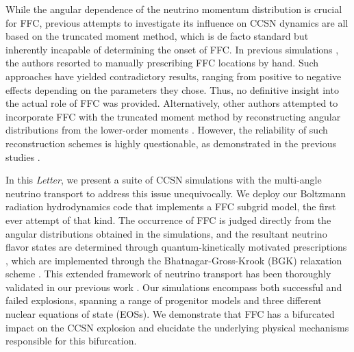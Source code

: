 \documentclass[
reprint,
superscriptaddress,
amsmath,amssymb,
aps,
prl
]{revtex4-2}
\begin{document}
While the angular dependence of the neutrino momentum distribution is crucial for FFC, previous attempts to investigate its influence on CCSN dynamics are all based on the truncated moment method, which is de facto standard but inherently incapable of determining the onset of FFC.
In previous simulations \cite{Ehring2023PhRvD.107j3034E,Ehring2023PhRvL.131f1401E,Mori2025PASJ..tmp...18M}, the authors resorted to manually prescribing FFC locations by hand. Such approaches have yielded contradictory results, ranging from positive to negative effects depending on the parameters they chose. Thus, no definitive insight into the actual role of FFC was provided.
Alternatively, other authors attempted to incorporate FFC with the truncated moment method by reconstructing angular distributions from the lower-order moments \cite{Wang2025ApJ...986..153W,Wang2025arXiv251120767W}.
However, the reliability of such reconstruction schemes is highly questionable, as demonstrated in the previous studies \cite{Nagakura2021PhRvD.104f3014N,Nagakura2021PhRvD.104h3025N,Johns2021PhRvD.103l3012J,Cornelius2025PhRvD.112f3004C}.

In this {\em Letter}, we present a suite of CCSN simulations with the multi-angle neutrino transport to address this issue unequivocally. We deploy our Boltzmann radiation hydrodynamics code that implements a FFC subgrid model, the first ever attempt of that kind.
The occurrence of FFC is judged directly from the angular distributions obtained in the simulations, and the resultant neutrino flavor states are determined through quantum-kinetically motivated prescriptions \cite{Nagakura2019ApJ...886..139N,Zaizen2023PhRvD.107j3022Z}, which are implemented through the Bhatnagar-Gross-Krook (BGK) relaxation scheme \cite{Bhatnagar1954PhRv...94..511B,Nagakura2024PhRvD.109h3013N}.
This extended framework of neutrino transport has been thoroughly validated in our previous work \cite{Akaho2025PhRvD.112d3015A}.
Our simulations encompass both successful and failed explosions, spanning a range of progenitor models and three different nuclear equations of state (EOSs).
We demonstrate that FFC has a bifurcated impact on the CCSN explosion and elucidate the underlying physical mechanisms responsible for this bifurcation.
\end{document}

